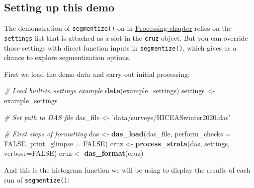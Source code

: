 \documentclass[
]{book}
\newenvironment{Shaded}{\begin{snugshade}}{\end{snugshade}}
\newcommand{\CommentTok}[1]{\textcolor[rgb]{0.56,0.35,0.01}{\textit{#1}}}
\newcommand{\DataTypeTok}[1]{\textcolor[rgb]{0.13,0.29,0.53}{#1}}
\newcommand{\KeywordTok}[1]{\textcolor[rgb]{0.13,0.29,0.53}{\textbf{#1}}}
\newcommand{\NormalTok}[1]{#1}
\newcommand{\OtherTok}[1]{\textcolor[rgb]{0.56,0.35,0.01}{#1}}
\newcommand{\StringTok}[1]{\textcolor[rgb]{0.31,0.60,0.02}{#1}}
\begin{document}
\hypertarget{setting-up-this-demo}{%
\subsection*{Setting up this demo}\label{setting-up-this-demo}}

The demonstration of \texttt{segmentize()} on in \protect\hyperlink{processing}{Processing chapter} relies on the \texttt{settings} list that is attached as a slot in the \texttt{cruz} object. But you can override those settings with direct function inputs in \texttt{segmentize()}, which gives us a chance to explore segmentization options.

First we load the demo data and carry out initial processing:

\begin{Shaded}
\begin{Highlighting}[]
\CommentTok{# Load built-in settings example}
\KeywordTok{data}\NormalTok{(example_settings)}
\NormalTok{settings <-}\StringTok{ }\NormalTok{example_settings}

\CommentTok{# Set path to DAS file}
\NormalTok{das_file <-}\StringTok{ 'data/surveys/HICEASwinter2020.das'}

\CommentTok{# First steps of formatting}
\NormalTok{das <-}\StringTok{ }\KeywordTok{das_load}\NormalTok{(das_file, }
                \DataTypeTok{perform_checks =} \OtherTok{FALSE}\NormalTok{,}
                \DataTypeTok{print_glimpse =} \OtherTok{FALSE}\NormalTok{)}
\NormalTok{cruz <-}\StringTok{ }\KeywordTok{process_strata}\NormalTok{(das,}
\NormalTok{                       settings,}
                       \DataTypeTok{verbose=}\OtherTok{FALSE}\NormalTok{)}
\NormalTok{cruz <-}\StringTok{ }\KeywordTok{das_format}\NormalTok{(cruz)}
\end{Highlighting}
\end{Shaded}

And this is the histogram function we will be using to display the results of each run of \texttt{segmentize()}:
\end{document}
